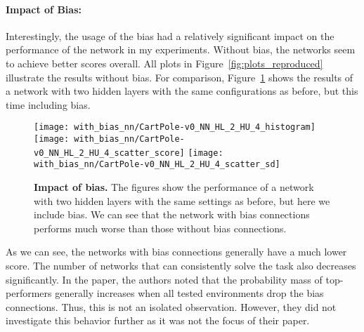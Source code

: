 \paragraph*{Impact of Bias:} Interestingly, the usage of the bias had a relatively significant impact on the performance of the network in my experiments. Without bias, the networks seem to achieve better scores overall. All plots in Figure~\ref{fig:plots_reproduced} illustrate the results without bias. For comparison, Figure~\ref{fig:comparison_bias} shows the results of a network with two hidden layers with the same configurations as before, but this time including bias.
\begin{figure}[ht]
\centering
\texttt{[image: with\_bias\_nn/CartPole-v0\_NN\_HL\_2\_HU\_4\_histogram]}
\texttt{[image: with\_bias\_nn/CartPole-v0\_NN\_HL\_2\_HU\_4\_scatter\_score]}
\texttt{[image: with\_bias\_nn/CartPole-v0\_NN\_HL\_2\_HU\_4\_scatter\_sd]}
\caption[Impact of bias]{
  \textbf{Impact of bias.}
  The figures show the performance of a network with two hidden layers with the same settings as before, but here we include bias. We can see that the network with bias connections performs much worse than those without bias connections.
}
\label{fig:comparison_bias}
\end{figure}
As we can see, the networks with bias connections generally have a much lower score. The number of networks that can consistently solve the task also decreases significantly. In the paper, the authors noted that the probability mass of top-performers generally increases when all tested environments drop the bias connections. Thus, this is not an isolated observation. However, they did not investigate this behavior further as it was not the focus of their paper.

